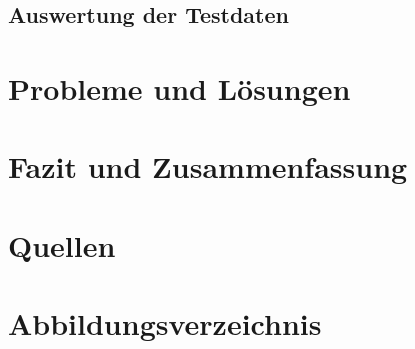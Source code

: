 \documentclass[12pt,a4paper]{scrreprt}
\begin{document}



\newpage
\section{Auswertung der Testdaten}


\newpage
\chapter{Probleme und Lösungen}

\chapter{Fazit und Zusammenfassung}

\chapter{Quellen}


\chapter{Abbildungsverzeichnis}
\listoffigures	
	
\end{document}
